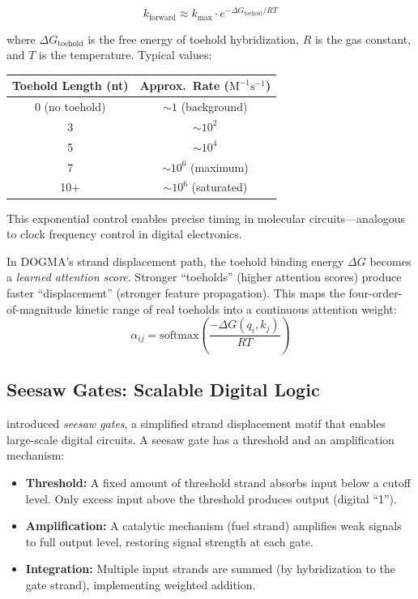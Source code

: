 \begin{equation}
k_{\text{forward}} \approx k_{\text{max}} \cdot e^{-\Delta G_{\text{toehold}} / RT}
\end{equation}

where $\Delta G_{\text{toehold}}$ is the free energy of toehold hybridization, $R$ is the gas constant, and $T$ is the temperature. Typical values:

\begin{center}
\renewcommand{\arraystretch}{1.15}
\begin{tabular}{cc}
\toprule
\textbf{Toehold Length (nt)} & \textbf{Approx.\ Rate ($\text{M}^{-1}\text{s}^{-1}$)} \\
\midrule
0 (no toehold) & $\sim 1$ (background) \\
3 & $\sim 10^2$ \\
5 & $\sim 10^4$ \\
7 & $\sim 10^6$ (maximum) \\
10+ & $\sim 10^6$ (saturated) \\
\bottomrule
\end{tabular}
\end{center}

This exponential control enables precise timing in molecular circuits---analogous to clock frequency control in digital electronics.

\begin{implnote}
In DOGMA's strand displacement path, the toehold binding energy $\Delta G$ becomes a \emph{learned attention score}. Stronger ``toeholds'' (higher attention scores) produce faster ``displacement'' (stronger feature propagation). This maps the four-order-of-magnitude kinetic range of real toeholds into a continuous attention weight:
\begin{equation}
\alpha_{ij} = \text{softmax}\left(\frac{-\Delta G(q_i, k_j)}{RT}\right)
\end{equation}
\end{implnote}

\subsection{Seesaw Gates: Scalable Digital Logic}

\citet{qian2011seesaw} introduced \emph{seesaw gates}, a simplified strand displacement motif that enables large-scale digital circuits. A seesaw gate has a threshold and an amplification mechanism:

\begin{itemize}[leftmargin=1.8em]
  \item \textbf{Threshold:} A fixed amount of threshold strand absorbs input below a cutoff level. Only excess input above the threshold produces output (digital ``1'').
  \item \textbf{Amplification:} A catalytic mechanism (fuel strand) amplifies weak signals to full output level, restoring signal strength at each gate.
  \item \textbf{Integration:} Multiple input strands are summed (by hybridization to the gate strand), implementing weighted addition.
\end{itemize}

